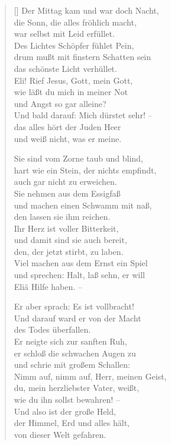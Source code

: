 \begin{multicols}{2}
\begin{verse}[\versewidth]
 Der Mittag kam und war doch Nacht,\\
die Sonn, die alles fröhlich macht,\\
war selbst mit Leid erfüllet.\\
Des Lichtes Schöpfer fühlet Pein,\\
drum mußt mit finstern Schatten sein\\
das schönste Licht verhüllet.\\
Eli! Rief Jesus, Gott, mein Gott,\\
wie läßt du mich in meiner Not\\
und Angst so gar alleine?\\
Und bald darauf: Mich dürstet sehr! –\\
das alles hört der Juden Heer\\
und weiß nicht, was er meine.

 Sie sind vom Zorne taub und blind,\\
hart wie ein Stein, der nichts empfindt,\\
auch gar nicht zu erweichen.\\
Sie nehmen aus dem Essigfaß\\
und machen einen Schwamm mit naß,\\
den lassen sie ihm reichen.\\
Ihr Herz ist voller Bitterkeit,\\
und damit sind sie auch bereit,\\
den, der jetzt stirbt, zu laben.\\
Viel machen aus dem Ernst ein Spiel\\
und sprechen: Halt, laß sehn, er will\\
Eliä Hilfe haben. –

 Er aber sprach: Es ist vollbracht!\\
Und darauf ward er von der Macht\\
des Todes überfallen.\\
Er neigte sich zur sanften Ruh,\\
er schloß die schwachen Augen zu\\
und schrie mit großem Schallen:\\
Nimm auf, nimm auf, Herr, meinen Geist,\\
du, mein herzliebster Vater, weißt,\\
wie du ihn sollst bewahren! –\\
Und also ist der große Held,\\
der Himmel, Erd und alles hält,\\
von dieser Welt gefahren.


\end{verse}
\end{multicols}
